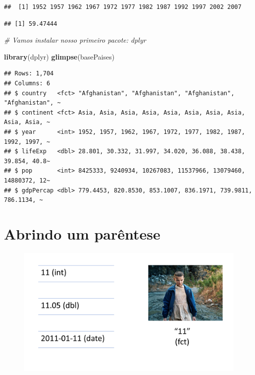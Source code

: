 \documentclass[
]{article}
\newenvironment{Shaded}{\begin{snugshade}}{\end{snugshade}}
\newcommand{\CommentTok}[1]{\textcolor[rgb]{0.56,0.35,0.01}{\textit{#1}}}
\newcommand{\KeywordTok}[1]{\textcolor[rgb]{0.13,0.29,0.53}{\textbf{#1}}}
\newcommand{\NormalTok}[1]{#1}
\newcommand{\OperatorTok}[1]{\textcolor[rgb]{0.81,0.36,0.00}{\textbf{#1}}}
\begin{document}
\begin{verbatim}
##  [1] 1952 1957 1962 1967 1972 1977 1982 1987 1992 1997 2002 2007
\end{verbatim}

\begin{Shaded}
\end{Shaded}

\begin{verbatim}
## [1] 59.47444
\end{verbatim}

\begin{Shaded}
\begin{Highlighting}[]
\CommentTok{# Vamos instalar nosso primeiro pacote: dplyr}

\KeywordTok{library}\NormalTok{(dplyr)}
\KeywordTok{glimpse}\NormalTok{(basePaises)}
\end{Highlighting}
\end{Shaded}

\begin{verbatim}
## Rows: 1,704
## Columns: 6
## $ country   <fct> "Afghanistan", "Afghanistan", "Afghanistan", "Afghanistan", ~
## $ continent <fct> Asia, Asia, Asia, Asia, Asia, Asia, Asia, Asia, Asia, Asia, ~
## $ year      <int> 1952, 1957, 1962, 1967, 1972, 1977, 1982, 1987, 1992, 1997, ~
## $ lifeExp   <dbl> 28.801, 30.332, 31.997, 34.020, 36.088, 38.438, 39.854, 40.8~
## $ pop       <int> 8425333, 9240934, 10267083, 11537966, 13079460, 14880372, 12~
## $ gdpPercap <dbl> 779.4453, 820.8530, 853.1007, 836.1971, 739.9811, 786.1134, ~
\end{verbatim}

\hypertarget{abrindo-um-paruxeantese}{%
\section{Abrindo um parêntese}\label{abrindo-um-paruxeantese}}

\begin{figure}

{\centering \includegraphics[width=1\linewidth,height=1\textheight]{imagem/eleven} 

}

\caption{ }\label{fig:eleven, figures-side}
\end{figure}
\end{document}
